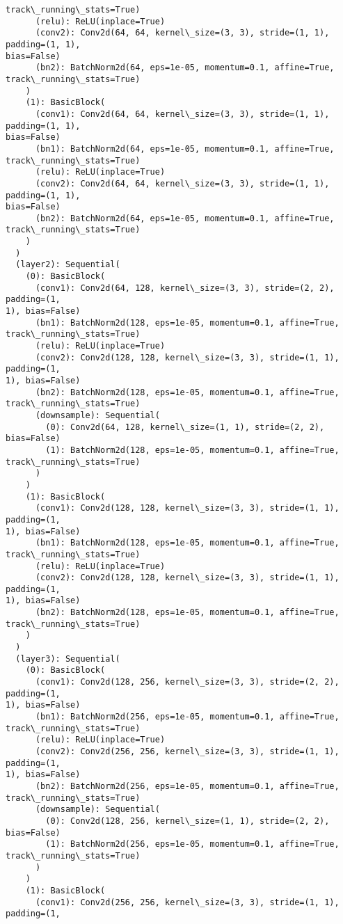 \documentclass[11pt]{article}
\begin{document}
\begin{Verbatim}[commandchars=\\\{\}]
track\_running\_stats=True)
      (relu): ReLU(inplace=True)
      (conv2): Conv2d(64, 64, kernel\_size=(3, 3), stride=(1, 1), padding=(1, 1),
bias=False)
      (bn2): BatchNorm2d(64, eps=1e-05, momentum=0.1, affine=True,
track\_running\_stats=True)
    )
    (1): BasicBlock(
      (conv1): Conv2d(64, 64, kernel\_size=(3, 3), stride=(1, 1), padding=(1, 1),
bias=False)
      (bn1): BatchNorm2d(64, eps=1e-05, momentum=0.1, affine=True,
track\_running\_stats=True)
      (relu): ReLU(inplace=True)
      (conv2): Conv2d(64, 64, kernel\_size=(3, 3), stride=(1, 1), padding=(1, 1),
bias=False)
      (bn2): BatchNorm2d(64, eps=1e-05, momentum=0.1, affine=True,
track\_running\_stats=True)
    )
  )
  (layer2): Sequential(
    (0): BasicBlock(
      (conv1): Conv2d(64, 128, kernel\_size=(3, 3), stride=(2, 2), padding=(1,
1), bias=False)
      (bn1): BatchNorm2d(128, eps=1e-05, momentum=0.1, affine=True,
track\_running\_stats=True)
      (relu): ReLU(inplace=True)
      (conv2): Conv2d(128, 128, kernel\_size=(3, 3), stride=(1, 1), padding=(1,
1), bias=False)
      (bn2): BatchNorm2d(128, eps=1e-05, momentum=0.1, affine=True,
track\_running\_stats=True)
      (downsample): Sequential(
        (0): Conv2d(64, 128, kernel\_size=(1, 1), stride=(2, 2), bias=False)
        (1): BatchNorm2d(128, eps=1e-05, momentum=0.1, affine=True,
track\_running\_stats=True)
      )
    )
    (1): BasicBlock(
      (conv1): Conv2d(128, 128, kernel\_size=(3, 3), stride=(1, 1), padding=(1,
1), bias=False)
      (bn1): BatchNorm2d(128, eps=1e-05, momentum=0.1, affine=True,
track\_running\_stats=True)
      (relu): ReLU(inplace=True)
      (conv2): Conv2d(128, 128, kernel\_size=(3, 3), stride=(1, 1), padding=(1,
1), bias=False)
      (bn2): BatchNorm2d(128, eps=1e-05, momentum=0.1, affine=True,
track\_running\_stats=True)
    )
  )
  (layer3): Sequential(
    (0): BasicBlock(
      (conv1): Conv2d(128, 256, kernel\_size=(3, 3), stride=(2, 2), padding=(1,
1), bias=False)
      (bn1): BatchNorm2d(256, eps=1e-05, momentum=0.1, affine=True,
track\_running\_stats=True)
      (relu): ReLU(inplace=True)
      (conv2): Conv2d(256, 256, kernel\_size=(3, 3), stride=(1, 1), padding=(1,
1), bias=False)
      (bn2): BatchNorm2d(256, eps=1e-05, momentum=0.1, affine=True,
track\_running\_stats=True)
      (downsample): Sequential(
        (0): Conv2d(128, 256, kernel\_size=(1, 1), stride=(2, 2), bias=False)
        (1): BatchNorm2d(256, eps=1e-05, momentum=0.1, affine=True,
track\_running\_stats=True)
      )
    )
    (1): BasicBlock(
      (conv1): Conv2d(256, 256, kernel\_size=(3, 3), stride=(1, 1), padding=(1,

\end{Verbatim}
\end{document}
